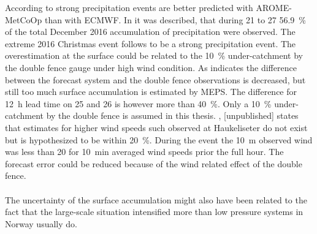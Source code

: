 According to \citet{muller_arome-metcoop:_2017} strong precipitation events are better predicted with AROME-MetCoOp than with ECMWF. In  it was described, that during \num{21} to \SI{27}{\dec} \SI{56.9}{\percent} of the total December 2016 accumulation of precipitation were observed. The extreme 2016 Christmas event follows to be a strong precipitation event. 
The overestimation at the surface could be related to the \SI{10}{\percent} under-catchment by the double fence gauge under high wind condition. As  indicates the difference between the forecast system and the double fence observations is decreased, but still too much surface accumulation is estimated by MEPS. The difference for \SI{12}{\hour} lead time on \num{25} and \SI{26}{\dec} is however more than \SI{40}{\percent}. Only a \SI{10}{\percent} under-catchment by the double fence is assumed in this thesis. 
\citet{wolff_wmo_2018}, [unpublished] states that estimates for higher wind speeds such observed at Haukeliseter do not exist but is hypothesized to be within \SI{20}{\percent}. During the event the \SI{10}{\metre} observed wind was less than \SI{20}{\mPs} for \SI{10}{\minute} averaged wind speeds prior the full hour.
The forecast error could be reduced because of the wind related effect of the double fence.
\\
\\
The uncertainty of the surface accumulation might also have been related to the fact that the large-scale situation intensified more than low pressure systems in Norway usually do. 
